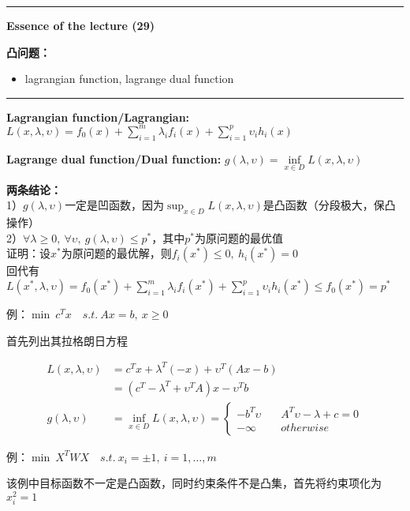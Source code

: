 \documentclass[11pt]{ctexart}         %
\newcommand{\oneline}[1][12pt]{\vspace{#1}}
\newcommand{\bc}[1]{\begin{cases}#1\end{cases}}
\newcommand{\li}[3][例]{
	#1：#2\\ 
	\phantom{#1：}\begin{minipage}[t]{0.9\linewidth}%
	\setlength\parskip{12pt}
	\setlength{\belowdisplayskip}{0pt}%
	\setlength{\abovedisplayskip}{0pt}%
	\setlength{\belowdisplayshortskip}{0pt}%
	\setlength{\abovedisplayshortskip}{0pt}%
	#3
	\end{minipage}
	\oneline}
\begin{document}
\setlength{\belowdisplayskip}{6pt}%
\setlength{\abovedisplayskip}{6pt}%
\setlength{\belowdisplayshortskip}{0pt}%
\setlength{\abovedisplayshortskip}{0pt}%

\hrule height 4pt
\begin{Large}
	\textbf{Essence of the lecture (29)}\\
\end{Large}
\begin{large}
	\textbf{凸问题：} 
\end{large}
\vspace{-16pt}
\begin{itemize} \setlength{\itemsep}{0pt}
	\item lagrangian function, lagrange dual function
\end{itemize}
\hrule height 4pt

\textbf{Lagrangian function/Lagrangian: }$ L(x,\lambda,\upsilon)=f_0(x)+\sum_{i=1}^{m}\lambda_i f_i(x)+\sum_{i=1}^{p}\upsilon_ih_i(x) $

\textbf{Lagrange dual function/Dual function: }$ g(\lambda,\upsilon)=\inf\limits_{x\in D}L(x,\lambda,\upsilon) $

\textbf{两条结论：}\\
1）$ g(\lambda,\upsilon) $一定是凹函数，因为$ \sup_{x\in D}L(x,\lambda,\upsilon) $是凸函数（分段极大，保凸操作）\\
2）$ \forall \lambda\geq 0,\ \forall \upsilon,\ g(\lambda,\upsilon)\leq p^*$，其中$ p^* $为原问题的最优值\\
\phantom{2）}证明：设$ x^* $为原问题的最优解，则$ f_i(x^*)\leq 0,\ h_i(x^*)=0$\\
\phantom{2）}回代有$ L(x^*,\lambda,\upsilon)=f_0(x^*)+\sum_{i=1}^{m}\lambda_i f_i(x^*)+\sum_{i=1}^{p}\upsilon_ih_i(x^*)\leq f_0(x^*)=p^*$

\li{$\min\ c^Tx\quad s.t.\ Ax=b,\ x\geq0$}{
	首先列出其拉格朗日方程
	\begin{fleqn}
		\begin{align*}
			L(x,\lambda,\upsilon)&=c^Tx+\lambda^T(-x)+\upsilon^T(Ax-b)\\
			&=(c^T-\lambda^T+\upsilon^TA)x-\upsilon^Tb\\
			g(\lambda,\upsilon)&=\inf_{x\in D}L(x,\lambda,\upsilon)=
			\bc{-b^T\upsilon\quad &A^T\upsilon-\lambda+c=0\\-\infty\quad &otherwise}
		\end{align*}
	\end{fleqn}
}

\li{$\min\ X^TWX\quad s.t.\ x_i=\pm 1,\ i=1,\dots,m$ }{
	该例中目标函数不一定是凸函数，同时约束条件不是凸集，首先将约束项化为$ x_i^2=1 $
}
\end{document}
